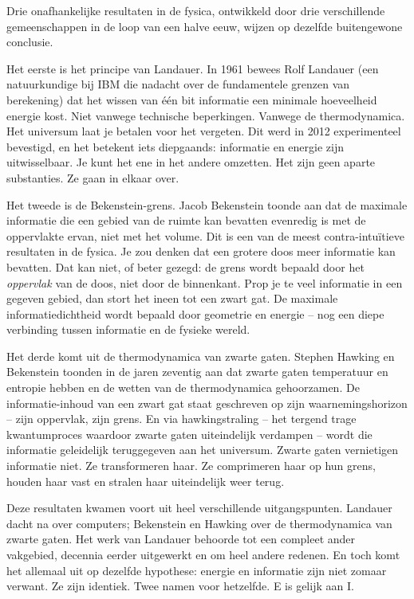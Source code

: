 \documentclass[11pt, twoside, openright]{book}
\begin{document}
Drie onafhankelijke resultaten in de fysica, ontwikkeld door drie verschillende gemeenschappen in de loop van een halve eeuw, wijzen op dezelfde buitengewone conclusie.

Het eerste is het principe van Landauer. In 1961 bewees Rolf Landauer (een natuurkundige bij IBM die nadacht over de fundamentele grenzen van berekening) dat het wissen van één bit informatie een minimale hoeveelheid energie kost. Niet vanwege technische beperkingen. Vanwege de thermodynamica. Het universum laat je betalen voor het vergeten. Dit werd in 2012 experimenteel bevestigd, en het betekent iets diepgaands: informatie en energie zijn uitwisselbaar. Je kunt het ene in het andere omzetten. Het zijn geen aparte substanties. Ze gaan in elkaar over.

Het tweede is de Bekenstein-grens. Jacob Bekenstein toonde aan dat de maximale informatie die een gebied van de ruimte kan bevatten evenredig is met de oppervlakte ervan, niet met het volume. Dit is een van de meest contra-intuïtieve resultaten in de fysica. Je zou denken dat een grotere doos meer informatie kan bevatten. Dat kan niet, of beter gezegd: de grens wordt bepaald door het \textit{oppervlak} van de doos, niet door de binnenkant. Prop je te veel informatie in een gegeven gebied, dan stort het ineen tot een zwart gat. De maximale informatiedichtheid wordt bepaald door geometrie en energie -- nog een diepe verbinding tussen informatie en de fysieke wereld.

Het derde komt uit de thermodynamica van zwarte gaten. Stephen Hawking en Bekenstein toonden in de jaren zeventig aan dat zwarte gaten temperatuur en entropie hebben en de wetten van de thermodynamica gehoorzamen. De informatie-inhoud van een zwart gat staat geschreven op zijn waarnemingshorizon -- zijn oppervlak, zijn grens. En via hawkingstraling -- het tergend trage kwantumproces waardoor zwarte gaten uiteindelijk verdampen -- wordt die informatie geleidelijk teruggegeven aan het universum. Zwarte gaten vernietigen informatie niet. Ze transformeren haar. Ze comprimeren haar op hun grens, houden haar vast en stralen haar uiteindelijk weer terug.

Deze resultaten kwamen voort uit heel verschillende uitgangspunten. Landauer dacht na over computers; Bekenstein en Hawking over de thermodynamica van zwarte gaten. Het werk van Landauer behoorde tot een compleet ander vakgebied, decennia eerder uitgewerkt en om heel andere redenen. En toch komt het allemaal uit op dezelfde hypothese: energie en informatie zijn niet zomaar verwant. Ze zijn identiek. Twee namen voor hetzelfde. E is gelijk aan I.
\end{document}
